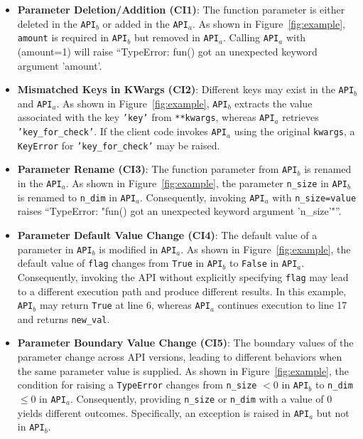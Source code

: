 \begin{itemize}[leftmargin=*]
    \item {\textbf{Parameter Deletion/Addition (CI1)}: The function parameter is either deleted in the \texttt{API}$_{b}$ or added in the \texttt{API}$_{a}$. As shown in Figure~\ref{fig:example}, \texttt{amount} is required in \texttt{API}$_{b}$ but removed in \texttt{API}$_{a}$. Calling \texttt{API}$_{a}$ with (amount=1) will raise ``{TypeError}: fun() got an unexpected keyword argument 'amount'.}
    
    \item \textbf{Mismatched Keys in KWargs (CI2)}: Different keys may exist in the \texttt{API}$_{b}$ and \texttt{API}$_{a}$. As shown in Figure~\ref{fig:example}, \texttt{API}$_b$ extracts the value associated with the key \texttt{'key'} from \texttt{**kwargs}, whereas \texttt{API}$_a$ retrieves \texttt{'key\_for\_check'}. If the client code invokes \texttt{API}$_a$ using the original \texttt{kwargs}, a \texttt{KeyError} for \texttt{'key\_for\_check'} may be raised.

    \item \textbf{Parameter Rename (CI3)}: The function parameter from \texttt{API}$_{b}$ is renamed in the \texttt{API}$_{a}$. As shown in Figure~\ref{fig:example}, the parameter \texttt{n\_size} in \texttt{API}$_b$ is renamed to \texttt{n\_dim} in \texttt{API}$_a$. Consequently, invoking \texttt{API}$_a$ with \texttt{n\_size=value} raises ``{TypeError}: "fun() got an unexpected keyword argument 'n\_size'"''.
    
    \item \textbf{Parameter Default Value Change (CI4)}: The default value of a parameter in \texttt{API}$_b$ is modified in \texttt{API}$_a$. As shown in Figure~\ref{fig:example}, the default value of \texttt{flag} changes from \texttt{True} in \texttt{API}${_b}$ to \texttt{False} in \texttt{API}${_a}$. Consequently, invoking the API without explicitly specifying \texttt{flag} may lead to a different execution path and produce different results. In this example, \texttt{API}$_b$ may return \texttt{True} at line 6, whereas \texttt{API}$_a$ continues execution to line 17 and returns \texttt{new\_val}.
    


    \item \textbf{Parameter Boundary Value Change (CI5)}: The boundary values of the parameter change across API versions, leading to different behaviors when the same parameter value is supplied. As shown in Figure~\ref{fig:example}, the condition for raising a \texttt{TypeError} changes from \texttt{n\_size} $< 0$ in \texttt{API}${_b}$ to \texttt{n\_dim} $\le 0$ in \texttt{API}${_a}$. Consequently, providing \texttt{n\_size} or \texttt{n\_dim} with a value of 0 yields different outcomes. Specifically, an exception is raised in \texttt{API}${_a}$ but not in \texttt{API}${_b}$.


\end{itemize}

